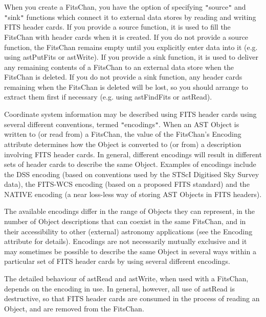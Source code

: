 \documentclass[twoside,11pt]{article}
\newcommand{\htmlref}[2]{#1}
\begin{document}
{{      When you create a FitsChan, you have the option of specifying
      {\tt{"}}source{\tt{"}} and {\tt{"}}sink{\tt{"}} functions which connect it to external data
      stores by reading and writing FITS header cards. If you provide
      a source function, it is used to fill the FitsChan with header
      cards when it is created. If you do not provide a source
      function, the FitsChan remains empty until you explicitly enter
      data into it (e.g. using astPutFits or astWrite). If you
      provide a sink function, it is used to deliver any remaining
      contents of a FitsChan to an external data store when the
      FitsChan is deleted. If you do not provide a sink function, any
      header cards remaining when the FitsChan is deleted will be
      lost, so you should arrange to extract them first if necessary
      (e.g. using astFindFits or \htmlref{astRead}{astRead}).

      Coordinate system information may be described using FITS header
      cards using several different conventions, termed
      {\tt{"}}encodings{\tt{"}}. When an AST Object is written to (or read from) a
      FitsChan, the value of the FitsChan's \htmlref{Encoding}{Encoding} attribute
      determines how the Object is converted to (or from) a
      description involving FITS header cards. In general, different
      encodings will result in different sets of header cards to
      describe the same Object. Examples of encodings include the DSS
      encoding (based on conventions used by the STScI Digitised Sky
      Survey data), the FITS-WCS encoding (based on a proposed FITS
      standard) and the NATIVE encoding (a near loss-less way of
      storing AST Objects in FITS headers).

      The available encodings differ in the range of Objects they can
      represent, in the number of Object descriptions that can coexist
      in the same FitsChan, and in their accessibility to other
      (external) astronomy applications (see the Encoding attribute
      for details). Encodings are not necessarily mutually exclusive
      and it may sometimes be possible to describe the same Object in
      several ways within a particular set of FITS header cards by
      using several different encodings.

      The detailed behaviour of astRead and astWrite, when used with
      a FitsChan, depends on the encoding in use. In general, however,
      all use of astRead is destructive, so that FITS header cards
      are consumed in the process of reading an Object, and are
      removed from the FitsChan.

}}
\end{document}
